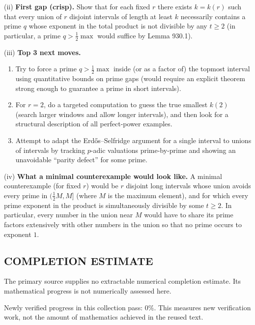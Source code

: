 (ii) \textbf{First gap (crisp).}
Show that for each fixed $r$ there exists $k=k(r)$ such that every union of $r$ disjoint intervals of length at least $k$ necessarily contains a prime $q$ whose exponent in the total product is not divisible by any $t\ge 2$ (in particular, a prime $q>\tfrac12\max$ would suffice by Lemma 930.1).

(iii) \textbf{Top 3 next moves.}
\begin{enumerate}
\item Try to force a prime $q>\tfrac12\max$ inside (or as a factor of) the topmost interval using quantitative bounds on prime gaps (would require an explicit theorem strong enough to guarantee a prime in short intervals).
\item For $r=2$, do a targeted computation to guess the true smallest $k(2)$ (search larger windows and allow longer intervals), and then look for a structural description of all perfect-power examples.
\item Attempt to adapt the Erd\H{o}s--Selfridge argument for a single interval to unions of intervals by tracking $p$-adic valuations prime-by-prime and showing an unavoidable ``parity defect'' for some prime.
\end{enumerate}

(iv) \textbf{What a minimal counterexample would look like.}
A minimal counterexample (for fixed $r$) would be $r$ disjoint long intervals whose union avoids every prime in $(\tfrac12M,M]$ (where $M$ is the maximum element), and for which every prime exponent in the product is simultaneously divisible by some $t\ge 2$. In particular, every number in the union near $M$ would have to share its prime factors extensively with other numbers in the union so that no prime occurs to exponent $1$.




\subsection*{COMPLETION ESTIMATE}
The primary source supplies no extractable numerical completion estimate. Its mathematical progress is not numerically assessed here.

Newly verified progress in this collection pass: $0\%$. This measures new verification work, not the amount of mathematics achieved in the reused text.
